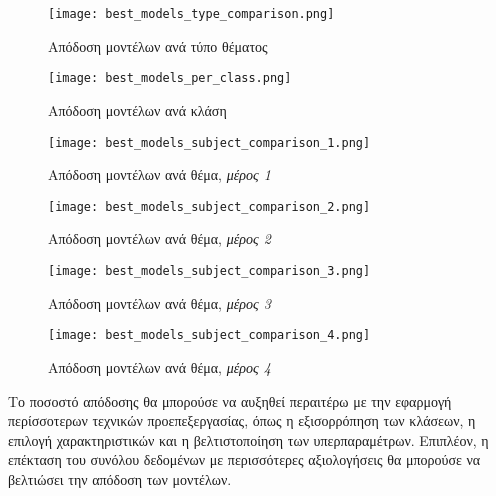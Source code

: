 \begin{figure}[H]
  \begin{center}
    \texttt{[image: best\_models\_type\_comparison.png]}
    \caption{Απόδοση μοντέλων ανά τύπο θέματος}
  \end{center}
  \label{fig:TypeQuery}
\end{figure}

\begin{figure}[H]
  \begin{center}
    \texttt{[image: best\_models\_per\_class.png]}
    \caption{Απόδοση μοντέλων ανά κλάση}
  \end{center}
  \label{fig:ClassQuery}
\end{figure}

\begin{figure}[H]
  \begin{center}
    \texttt{[image: best\_models\_subject\_comparison\_1.png]}
    \caption{Απόδοση μοντέλων ανά θέμα, \textit{μέρος 1}}
  \end{center}
  \label{fig:Subjectres1}
\end{figure}

\begin{figure}[H]
  \begin{center}
    \texttt{[image: best\_models\_subject\_comparison\_2.png]}
    \caption{Απόδοση μοντέλων ανά θέμα, \textit{μέρος 2}}
  \end{center}
  \label{fig:Subjectres2}
\end{figure}

\begin{figure}[H]
  \begin{center}
    \texttt{[image: best\_models\_subject\_comparison\_3.png]}
    \caption{Απόδοση μοντέλων ανά θέμα, \textit{μέρος 3}}
  \end{center}
  \label{fig:Subjectres3}
\end{figure}

\begin{figure}[H]
  \begin{center}
    \texttt{[image: best\_models\_subject\_comparison\_4.png]}
    \caption{Απόδοση μοντέλων ανά θέμα, \textit{μέρος 4}}
  \end{center}
  \label{fig:Subjectres3}
\end{figure}

Το ποσοστό απόδοσης θα μπορούσε να αυξηθεί περαιτέρω με την εφαρμογή
περίσσοτερων
τεχνικών προεπεξεργασίας, όπως η εξισορρόπηση των κλάσεων, η επιλογή
χαρακτηριστικών και η βελτιστοποίηση των υπερπαραμέτρων. Επιπλέον, η
επέκταση του συνόλου δεδομένων με περισσότερες αξιολογήσεις θα μπορούσε
να βελτιώσει την απόδοση των μοντέλων.

